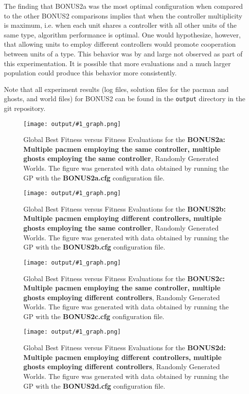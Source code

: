 \documentclass[11pt]{article}
\newcommand{\fitnessplotcaption}[2]{\caption{Global Best Fitness versus Fitness Evaluations for the \textbf{{#1}}, Randomly Generated Worlds. The figure was generated with data obtained by running the GP with the \textbf{{#2}} configuration file.}}
\newcommand{\addgraphic}[1]{\centerline{\texttt{[image: output/\#1\_graph.png]}}}
\begin{document}
The finding that BONUS2a was the most optimal configuration when compared to the other BONUS2 comparisons implies
that when the controller multiplicity is maximum, i.e. when each unit shares a controller with all other units 
of the same type, algorithm performance is optimal. One would hypothesize, however, that allowing units
to employ different controllers would promote cooperation between units of a type. This behavior was by and large not
observed as part of this experimentation. It is possible that more evaluations and a much larger population could
produce this behavior more consistently.

Note that all experiment results (log files, solution files for the pacman and ghosts, and world files) for BONUS2 can be
found in the \texttt{output} directory in the git repository.

\begin{figure}[H]
    \addgraphic{BONUS2a}
    \fitnessplotcaption{BONUS2a: Multiple pacmen employing the same controller, multiple ghosts employing the same controller}{BONUS2a.cfg}
    \label{fig:BONUS2a}
\end{figure}

\begin{figure}[H]
    \addgraphic{BONUS2b}
    \fitnessplotcaption{BONUS2b: Multiple pacmen employing different controllers, multiple ghosts employing the same controller}{BONUS2b.cfg}
    \label{fig:BONUS2b}
\end{figure}

\begin{figure}[H]
    \addgraphic{BONUS2c}
    \fitnessplotcaption{BONUS2c: Multiple pacmen employing the same controller, multiple ghosts employing different controllers}{BONUS2c.cfg}
    \label{fig:BONUS2c}
\end{figure}

\begin{figure}[H]
    \addgraphic{BONUS2d}
    \fitnessplotcaption{BONUS2d: Multiple pacmen employing different controllers, multiple ghosts employing different controllers}{BONUS2d.cfg}
    \label{fig:BONUS2d}
\end{figure}
\end{document}
